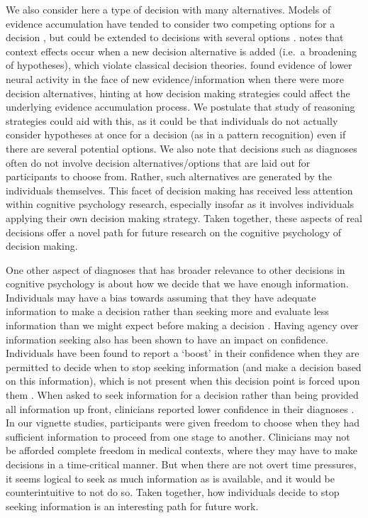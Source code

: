 \documentclass[a4paper, nobind]{templates/ociamthesis}
\begin{document}
We also consider here a type of decision with many alternatives. Models of evidence accumulation have tended to consider two competing options for a decision \autocite{mcmillen_dynamics_2006}, but could be extended to decisions with several options \autocite{brown_observing_2009}. \textcite{trueblood2022} notes that context effects occur when a new decision alternative is added (i.e.~a broadening of hypotheses), which violate classical decision theories. \textcite{churchland2012} found evidence of lower neural activity in the face of new evidence/information when there were more decision alternatives, hinting at how decision making strategies could affect the underlying evidence accumulation process. We postulate that study of reasoning strategies could aid with this, as it could be that individuals do not actually consider hypotheses at once for a decision (as in a pattern recognition) even if there are several potential options. We also note that decisions such as diagnoses often do not involve decision alternatives/options that are laid out for participants to choose from. Rather, such alternatives are generated by the individuals themselves. This facet of decision making has received less attention within cognitive psychology research, especially insofar as it involves individuals applying their own decision making strategy. Taken together, these aspects of real decisions offer a novel path for future research on the cognitive psychology of decision making.

One other aspect of diagnoses that has broader relevance to other decisions in cognitive psychology is about how we decide that we have enough information. Individuals may have a bias towards assuming that they have adequate information to make a decision rather than seeking more \autocite{gehlbach_illusion_2024} and evaluate less information than we might expect before making a decision \autocite{klein_people_2018}. Having agency over information seeking also has been shown to have an impact on confidence. Individuals have been found to report a `boost' in their confidence when they are permitted to decide when to stop seeking information (and make a decision based on this information), which is not present when this decision point is forced upon them \autocite{wei_confidence_2021}. When asked to seek information for a decision rather than being provided all information up front, clinicians reported lower confidence in their diagnoses \autocite{gruppen_information_1991}. In our vignette studies, participants were given freedom to choose when they had sufficient information to proceed from one stage to another. Clinicians may not be afforded complete freedom in medical contexts, where they may have to make decisions in a time-critical manner. But when there are not overt time pressures, it seems logical to seek as much information as is available, and it would be counterintuitive to not do so. Taken together, how individuals decide to stop seeking information is an interesting path for future work.
\end{document}
